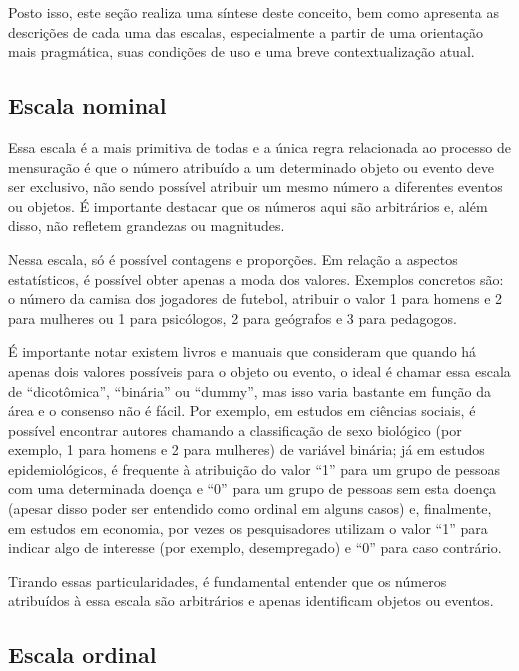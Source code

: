 \documentclass[
]{book}
\begin{document}
Posto isso, este seção realiza uma síntese deste conceito, bem como apresenta as descrições de cada uma das escalas, especialmente a partir de uma orientação mais pragmática, suas condições de uso e uma breve contextualização atual.

\hypertarget{escala-nominal}{%
\subsection{Escala nominal}\label{escala-nominal}}

Essa escala é a mais primitiva de todas e a única regra relacionada ao processo de mensuração é que o número atribuído a um determinado objeto ou evento deve ser exclusivo, não sendo possível atribuir um mesmo número a diferentes eventos ou objetos. É importante destacar que os números aqui são arbitrários e, além disso, não refletem grandezas ou magnitudes.

Nessa escala, só é possível contagens e proporções. Em relação a aspectos estatísticos, é possível obter apenas a moda dos valores. Exemplos concretos são: o número da camisa dos jogadores de futebol, atribuir o valor 1 para homens e 2 para mulheres ou 1 para psicólogos, 2 para geógrafos e 3 para pedagogos.

É importante notar existem livros e manuais que consideram que quando há apenas dois valores possíveis para o objeto ou evento, o ideal é chamar essa escala de ``dicotômica'', ``binária'' ou ``dummy'', mas isso varia bastante em função da área e o consenso não é fácil. Por exemplo, em estudos em ciências sociais, é possível encontrar autores chamando a classificação de sexo biológico (por exemplo, 1 para homens e 2 para mulheres) de variável binária; já em estudos epidemiológicos, é frequente à atribuição do valor ``1'' para um grupo de pessoas com uma determinada doença e ``0'' para um grupo de pessoas sem esta doença (apesar disso poder ser entendido como ordinal em alguns casos) e, finalmente, em estudos em economia, por vezes os pesquisadores utilizam o valor ``1'' para indicar algo de interesse (por exemplo, desempregado) e ``0'' para caso contrário.

Tirando essas particularidades, é fundamental entender que os números atribuídos à essa escala são arbitrários e apenas identificam objetos ou eventos.

\hypertarget{escala-ordinal}{%
\subsection{Escala ordinal}\label{escala-ordinal}}
\end{document}

